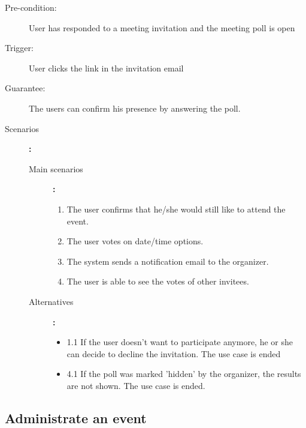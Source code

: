 \begin{description}
	\item[Pre-condition:] User has responded to a meeting invitation and the meeting poll is open
	\item[Trigger:] User clicks the link in the invitation email
	\item[Guarantee:] The users can confirm his presence by answering the poll.
	\item[Scenarios]\textbf{:}\\
				\begin{description}
					\item[Main scenarios]\textbf{:}\\
								\begin{enumerate}
									\item The user confirms that he/she would still like to attend the event.
									\item The user votes on date/time options.
									\item The system sends a notification email to the organizer.
									\item The user is able to see the votes of other invitees.
								\end{enumerate}
					\item[Alternatives]\textbf{:}\\
								\begin{itemize}
									\item 1.1 If the user doesn't want to participate anymore, he or she can decide to decline the invitation. The use case is ended
									\item 4.1 If the poll was marked 'hidden' by the organizer, the results are not shown. The use case is ended.
								\end{itemize}
				\end{description}
\end{description}


\subsection{Administrate an event}

